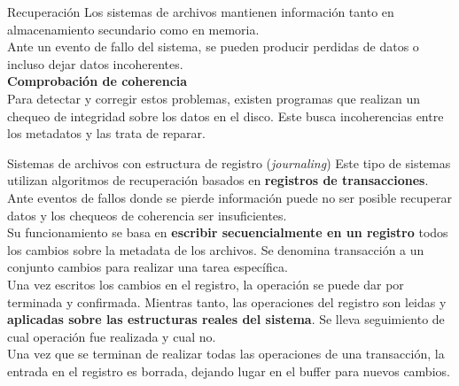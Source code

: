 \documentclass[aspectratio=169]{beamer}
\begin{document}
\begin{frame}[fragile,t]{Recuperación}
    Los sistemas de archivos mantienen información tanto en almacenamiento secundario como en memoria.\\
    Ante un evento de fallo del sistema, se pueden producir perdidas de datos o incluso dejar datos incoherentes.\\
    \bigskip
    \pause
    \textbf{Comprobación de coherencia}\\
    \bigskip
    Para detectar y corregir estos problemas, existen programas que realizan un chequeo de integridad sobre los datos en el disco.
    Este busca incoherencias entre los metadatos y las trata de reparar. 
\end{frame}


\begin{frame}[fragile,t]{Sistemas de archivos con estructura de registro (\emph{journaling})}
    Este tipo de sistemas utilizan algoritmos de recuperación basados en \textbf{registros de transacciones}.
    Ante eventos de fallos donde se pierde información puede no ser posible recuperar datos y los chequeos de coherencia ser insuficientes.\\
    \bigskip
    \pause
    Su funcionamiento se basa en \textcolor{naranjauca}{\textbf{escribir secuencialmente en un registro}}
    todos los cambios sobre la metadata de los archivos.
    \textcolor{verdeuca}{Se denomina transacción a un conjunto cambios para realizar una tarea específica.}\\
    \bigskip
    \pause
    Una vez escritos los cambios en el registro, la operación se puede dar por terminada y confirmada.
    \textcolor{verdeuca}{Mientras tanto, las operaciones del registro son leidas y \textbf{aplicadas sobre las estructuras reales del sistema}.}
    Se lleva seguimiento de cual operación fue realizada y cual no.\\
    \bigskip
    \pause
    Una vez que se terminan de realizar todas las operaciones de una transacción, la entrada en el registro es borrada, dejando lugar en el buffer para nuevos cambios.
\end{frame}
\end{document}
